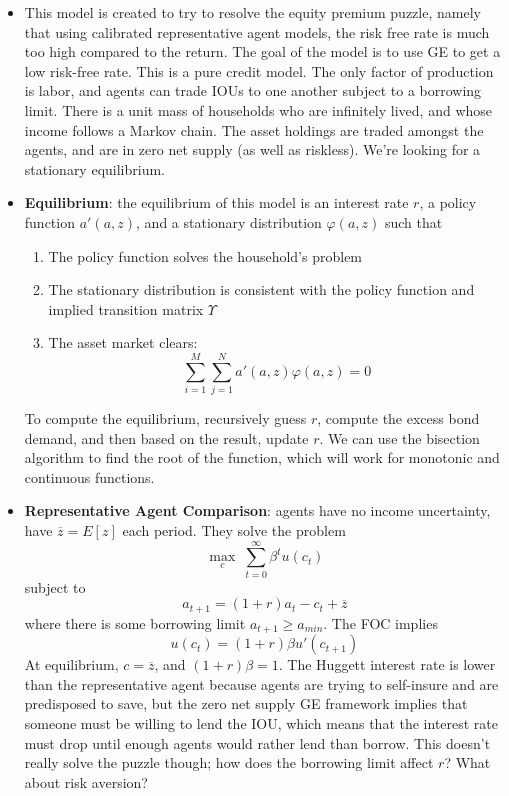 \documentclass[12pt]{article}
\begin{document}
\begin{itemize}
    \item This model is created to try to resolve the equity premium puzzle, namely that using calibrated representative agent models, the risk free rate is much too high compared to the return. The goal of the model is to use GE to get a low risk-free rate. This is a pure credit model. The only factor of production is labor, and agents can trade IOUs to one another subject to a borrowing limit. There is a unit mass of households who are infinitely lived, and whose income follows a Markov chain. The asset holdings are traded amongst the agents, and are in zero net supply (as well as riskless). We're looking for a stationary equilibrium. 
    \item \textbf{Equilibrium}: the equilibrium of this model is an interest rate $r$, a policy function $a'(a,z)$, and a stationary distribution $\varphi(a,z)$ such that
    \begin{enumerate}
        \item The policy function solves the household's problem
        \item The stationary distribution is consistent with the policy function and implied transition matrix $\Upsilon$
        \item The asset market clears:
        \[\sum_{i=1}^M\sum_{j=1}^Na'(a,z)\varphi(a,z) = 0\]
    \end{enumerate}
    To compute the equilibrium, recursively guess $r$, compute the excess bond demand, and then based on the result, update $r$. We can use the bisection algorithm to find the root of the function, which will work for monotonic and continuous functions.
    \item \textbf{Representative Agent Comparison}: agents have no income uncertainty, have $\overline{z} = E[z]$ each period. They solve the problem
    \[\max_{c}\; \sum_{t=0}^{\infty}\beta^tu(c_t)\]
    subject to
    \[a_{t+1} = (1+r)a_t - c_t + \overline{z}\]
    where there is some borrowing limit $a_{t+1} \geq a_{min}$. The FOC implies
    \[u(c_t) = (1+r)\beta u'(c_{t+1})\]
    At equilibrium, $c = \overline{z}$, and $(1+r)\beta = 1$. The Huggett interest rate is lower than the representative agent because agents are trying to self-insure and are predisposed to save, but the zero net supply GE framework implies that someone must be willing to lend the IOU, which means that the interest rate must drop until enough agents would rather lend than borrow. This doesn't really solve the puzzle though; how does the borrowing limit affect $r$? What about risk aversion?
\end{itemize}
\end{document}
